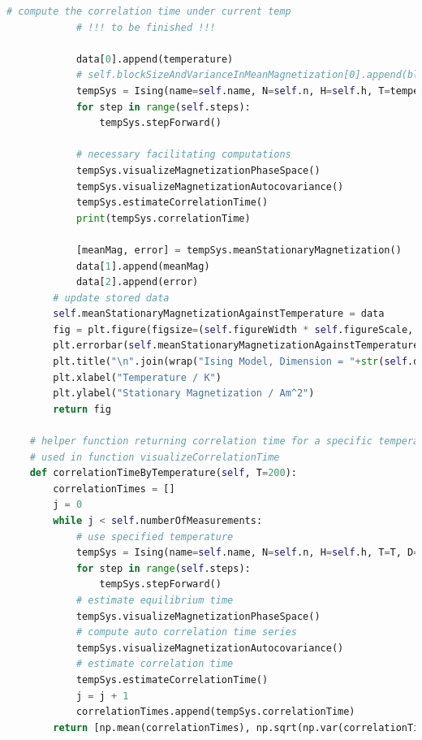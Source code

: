 \documentclass[%
showkeys,
bibnotes,
amsmath,amssymb,
floatfix,
]{revtex4-1}
\begin{document}
\begin{lstlisting}[language=Python]
            # compute the correlation time under current temp
            # !!! to be finished !!! 

            data[0].append(temperature)
            # self.blockSizeAndVarianceInMeanMagnetization[0].append(blockSize)
            tempSys = Ising(name=self.name, N=self.n, H=self.h, T=temperature, D=self.d, J=self.j, randomFill=self.randomFill, K=self.k, M=self.m, equilibriumTime=self.equilibriumTime, correlationTime=20, numberOfMeasurements=self.numberOfMeasurements)
            for step in range(self.steps):
                tempSys.stepForward()

            # necessary facilitating computations
            tempSys.visualizeMagnetizationPhaseSpace()
            tempSys.visualizeMagnetizationAutocovariance()
            tempSys.estimateCorrelationTime()
            print(tempSys.correlationTime)

            [meanMag, error] = tempSys.meanStationaryMagnetization()
            data[1].append(meanMag)
            data[2].append(error)
        # update stored data
        self.meanStationaryMagnetizationAgainstTemperature = data
        fig = plt.figure(figsize=(self.figureWidth * self.figureScale, self.figureHeight * self.figureScale), dpi=self.figureDpi)
        plt.errorbar(self.meanStationaryMagnetizationAgainstTemperature[0], self.meanStationaryMagnetizationAgainstTemperature[1], yerr=self.meanStationaryMagnetizationAgainstTemperature[2], fmt="+k")
        plt.title("\n".join(wrap("Ising Model, Dimension = "+str(self.d)+", N = "+str(self.n)+", Tc = "+str(sigfig.round(float(self.tc), sigfigs=4))+"K, Time = "+str(self.steps)+"a.u.", 60)))
        plt.xlabel("Temperature / K")
        plt.ylabel("Stationary Magnetization / Am^2")
        return fig

    # helper function returning correlation time for a specific temperature, keeping all other parameters as inputs
    # used in function visualizeCorrelationTime
    def correlationTimeByTemperature(self, T=200):
        correlationTimes = []
        j = 0
        while j < self.numberOfMeasurements:
            # use specified temperature
            tempSys = Ising(name=self.name, N=self.n, H=self.h, T=T, D=self.d, J=self.j, randomFill=self.randomFill, K=self.k, M=self.m, equilibriumTime=self.equilibriumTime, numberOfMeasurements=self.numberOfMeasurements)
            for step in range(self.steps):
                tempSys.stepForward()
            # estimate equilibrium time
            tempSys.visualizeMagnetizationPhaseSpace()
            # compute auto correlation time series
            tempSys.visualizeMagnetizationAutocovariance()
            # estimate correlation time
            tempSys.estimateCorrelationTime()
            j = j + 1
            correlationTimes.append(tempSys.correlationTime)
        return [np.mean(correlationTimes), np.sqrt(np.var(correlationTimes))]


\end{lstlisting}
\end{document}

